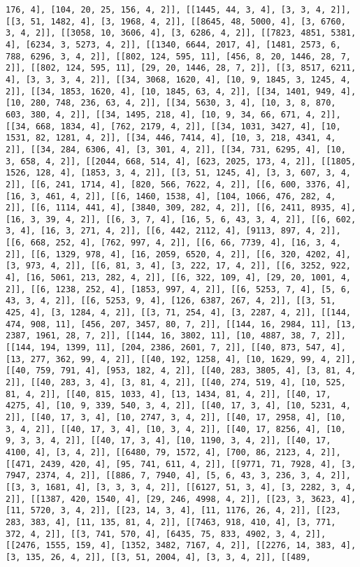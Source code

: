 \documentclass[12pt,fleqn]{article}\usepackage{../../common}
\begin{document}
\begin{verbatim}
176, 4], [104, 20, 25, 156, 4, 2]], [[1445, 44, 3, 4], [3, 3, 4, 2]], [[3, 51, 1482, 4], [3, 1968, 4, 2]], [[8645, 48, 5000, 4], [3, 6760, 3, 4, 2]], [[3058, 10, 3606, 4], [3, 6286, 4, 2]], [[7823, 4851, 5381, 4], [6234, 3, 5273, 4, 2]], [[1340, 6644, 2017, 4], [1481, 2573, 6, 788, 6296, 3, 4, 2]], [[802, 124, 595, 11], [456, 8, 20, 1446, 28, 7, 2]], [[802, 124, 595, 11], [29, 20, 1446, 28, 7, 2]], [[3, 8517, 6211, 4], [3, 3, 3, 4, 2]], [[34, 3068, 1620, 4], [10, 9, 1845, 3, 1245, 4, 2]], [[34, 1853, 1620, 4], [10, 1845, 63, 4, 2]], [[34, 1401, 949, 4], [10, 280, 748, 236, 63, 4, 2]], [[34, 5630, 3, 4], [10, 3, 8, 870, 603, 380, 4, 2]], [[34, 1495, 218, 4], [10, 9, 34, 66, 671, 4, 2]], [[34, 668, 1834, 4], [762, 2179, 4, 2]], [[34, 1031, 3427, 4], [10, 1531, 82, 1281, 4, 2]], [[34, 446, 7414, 4], [10, 3, 218, 4341, 4, 2]], [[34, 284, 6306, 4], [3, 301, 4, 2]], [[34, 731, 6295, 4], [10, 3, 658, 4, 2]], [[2044, 668, 514, 4], [623, 2025, 173, 4, 2]], [[1805, 1526, 128, 4], [1853, 3, 4, 2]], [[3, 51, 1245, 4], [3, 3, 607, 3, 4, 2]], [[6, 241, 1714, 4], [820, 566, 7622, 4, 2]], [[6, 600, 3376, 4], [16, 3, 461, 4, 2]], [[6, 1460, 1538, 4], [104, 1066, 476, 282, 4, 2]], [[6, 1114, 441, 4], [3840, 309, 282, 4, 2]], [[6, 2411, 8935, 4], [16, 3, 39, 4, 2]], [[6, 3, 7, 4], [16, 5, 6, 43, 3, 4, 2]], [[6, 602, 3, 4], [16, 3, 271, 4, 2]], [[6, 442, 2112, 4], [9113, 897, 4, 2]], [[6, 668, 252, 4], [762, 997, 4, 2]], [[6, 66, 7739, 4], [16, 3, 4, 2]], [[6, 1329, 978, 4], [16, 2059, 6520, 4, 2]], [[6, 320, 4202, 4], [3, 973, 4, 2]], [[6, 81, 3, 4], [3, 222, 17, 4, 2]], [[6, 3252, 922, 4], [16, 5061, 213, 282, 4, 2]], [[6, 322, 109, 4], [29, 20, 1001, 4, 2]], [[6, 1238, 252, 4], [1853, 997, 4, 2]], [[6, 5253, 7, 4], [5, 6, 43, 3, 4, 2]], [[6, 5253, 9, 4], [126, 6387, 267, 4, 2]], [[3, 51, 425, 4], [3, 1284, 4, 2]], [[3, 71, 254, 4], [3, 2287, 4, 2]], [[144, 474, 908, 11], [456, 207, 3457, 80, 7, 2]], [[144, 16, 2984, 11], [13, 2387, 1961, 28, 7, 2]], [[144, 16, 3802, 11], [10, 4887, 38, 7, 2]], [[144, 194, 1399, 11], [204, 2386, 2601, 7, 2]], [[40, 873, 547, 4], [13, 277, 362, 99, 4, 2]], [[40, 192, 1258, 4], [10, 1629, 99, 4, 2]], [[40, 759, 791, 4], [953, 182, 4, 2]], [[40, 283, 3805, 4], [3, 81, 4, 2]], [[40, 283, 3, 4], [3, 81, 4, 2]], [[40, 274, 519, 4], [10, 525, 81, 4, 2]], [[40, 815, 1033, 4], [13, 1434, 81, 4, 2]], [[40, 17, 4275, 4], [10, 9, 339, 540, 3, 4, 2]], [[40, 17, 3, 4], [10, 5231, 4, 2]], [[40, 17, 3, 4], [10, 2747, 3, 4, 2]], [[40, 17, 2958, 4], [10, 3, 4, 2]], [[40, 17, 3, 4], [10, 3, 4, 2]], [[40, 17, 8256, 4], [10, 9, 3, 3, 4, 2]], [[40, 17, 3, 4], [10, 1190, 3, 4, 2]], [[40, 17, 4100, 4], [3, 4, 2]], [[6480, 79, 1572, 4], [700, 86, 2123, 4, 2]], [[471, 2439, 420, 4], [95, 741, 611, 4, 2]], [[9771, 71, 7928, 4], [3, 7947, 2374, 4, 2]], [[886, 7, 7940, 4], [5, 6, 43, 3, 236, 3, 4, 2]], [[3, 3, 1681, 4], [3, 3, 3, 4, 2]], [[6127, 51, 3, 4], [3, 2282, 3, 4, 2]], [[1387, 420, 1540, 4], [29, 246, 4998, 4, 2]], [[23, 3, 3623, 4], [11, 5720, 3, 4, 2]], [[23, 14, 3, 4], [11, 1176, 26, 4, 2]], [[23, 283, 383, 4], [11, 135, 81, 4, 2]], [[7463, 918, 410, 4], [3, 771, 372, 4, 2]], [[3, 741, 570, 4], [6435, 75, 833, 4902, 3, 4, 2]], [[2476, 1555, 159, 4], [1352, 3482, 7167, 4, 2]], [[2276, 14, 383, 4], [3, 135, 26, 4, 2]], [[3, 51, 2004, 4], [3, 3, 4, 2]], [[489, 
\end{verbatim}
\end{document}
